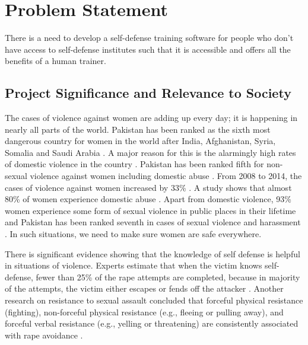 \section{Problem Statement}

There is a need to develop a self-defense training software for people who don’t have access to self-defense institutes such that it is accessible and offers all the benefits of a human trainer. 

\subsection{Project Significance and Relevance to Society}

The cases of violence against women are adding up every day; it is happening in nearly all parts of the world. Pakistan has been ranked as the sixth most dangerous country for women in the world after India, Afghanistan, Syria, Somalia and Saudi Arabia \cite{poll2018}. A major reason for this is the alarmingly high rates of domestic violence in the country \cite{domesticViolence}. Pakistan has been ranked fifth for non-sexual violence against women including domestic abuse \cite{poll2018}. From 2008 to 2014, the cases of violence against women increased by 33\% \cite{domesticViolence}. A study shows that almost 80\% of women experience domestic abuse \cite{genderBasedViolence}.  Apart from domestic violence, 93\% women experience some form of sexual violence in public places in their lifetime \cite{sexualViolence} and Pakistan has been ranked seventh in cases of sexual violence and harassment \cite{poll2018}. In such situations, we need to make sure women are safe everywhere. 


There is significant evidence showing that the knowledge of self defense is helpful in situations of violence. Experts estimate that when the victim knows self-defense, fewer than 25\% of the rape attempts are completed, because in majority of the attempts, the victim either escapes or fends off the attacker \cite{hollander}. Another research on resistance to sexual assault concluded that forceful physical resistance (fighting), non-forceful physical resistance (e.g., fleeing or pulling away), and forceful verbal resistance (e.g., yelling or threatening) are consistently associated with rape avoidance \cite{hollander}.


